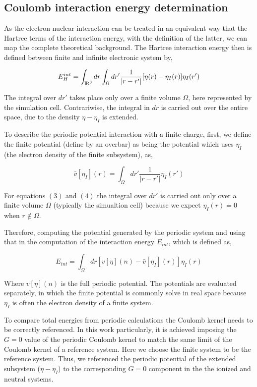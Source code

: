 \documentclass[12pt,a4paper]{article}
\begin{document}
\subsection{Coulomb interaction energy determination}

As the electron-nuclear interaction can be treated in an equivalent way that the Hartree terms of the interaction energy, with the definition of
the latter, we can map the complete theoretical background. The Hartree interaction energy then is defined between finite and infinite
electronic system by,

\begin{equation}
	E^{int}_H = \int_{{\rm I\!R}^3} dr \int_{\Omega} dr' \frac{1}{|r-r'|} [\eta(r)-\eta_{I}(r)]\eta_{I}(r') 
\end{equation}

The integral over $dr'$ takes place only over a finite volume $\Omega$, here represented by the simulation cell. Contrariwise, the integral in $dr$
is carried out over the entire space, due to the density $\eta -\eta_{I}$ is extended.

To describe the periodic potential interaction with a finite charge, first, we define the finite potential (define by an overbar) as being the potential which uses $\eta_{I}$ (the electron density of the finite subsystem), as,

\begin{equation}
	\bar{v} [\eta_I](r) = \int_{\Omega} dr' \frac{1}{|r-r'|} \eta_{I}(r')
\end{equation}

For equations $(3)$ and $(4)$ the integral over $dr'$ is carried out only over a finite volume $\Omega$ (typically the simualtion cell) because we expect $\eta_{I}(r)=0$ when $r \not\in \Omega$. 

Therefore, computing the potential generated by the periodic system and using that in the computation of the interaction energy $E_{int}$,
which is defined as,

\begin{equation}
	E_{int} = \int_{\Omega} dr [v[\eta](n)-\bar{v}[\eta_{I}](r)]\eta_{I}(r)
\end{equation}

Where $v[\eta](n)$ is the full periodic potential. The potentials are evaluated separately, in which the finite potential is commonly solve in real 
space because $\eta_{I}$ is often the electron density of a finite system. 

To compare total energies from periodic calculations the Coulomb kernel needs to be correctly referenced. In this work particularly, it is achieved 
imposing the $G=0$ value of the periodic Coulomb kernel to match the same limit of the Coulomb kernel of a reference system. Here we choose the
finite system to be the reference system. Thus, we referenced the periodic potential of the extended subsystem ($\eta -\eta_{I}$) to the corresponding
$G=0$ component in the the ionized and neutral systems. 
\end{document}
